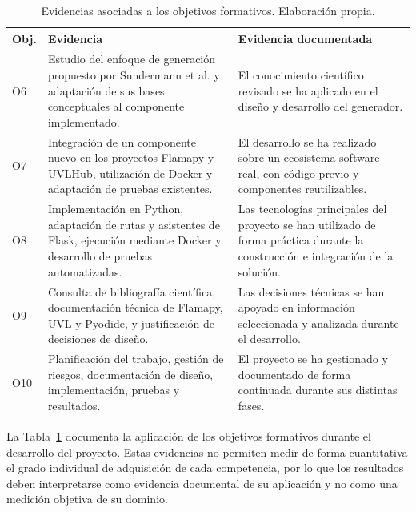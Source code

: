 \begin{table}[H]
\centering
\small
\setlength{\tabcolsep}{5pt}
\renewcommand{\arraystretch}{1.2}
\begin{tabularx}{\textwidth}{@{}
>{\centering\arraybackslash}p{0.9cm}
>{\raggedright\arraybackslash}p{3.8cm}
>{\raggedright\arraybackslash}X
@{}}
\toprule
\textbf{Obj.} & \textbf{Evidencia} & \textbf{Evidencia documentada} \\
\midrule
O6 & Estudio del enfoque de generación propuesto por Sundermann et al. y
adaptación de sus bases conceptuales al componente implementado. &
El conocimiento científico revisado se ha aplicado en el diseño y desarrollo
del generador. \\

O7 & Integración de un componente nuevo en los proyectos Flamapy y UVLHub,
utilización de Docker y adaptación de pruebas existentes. &
El desarrollo se ha realizado sobre un ecosistema software real, con código
previo y componentes reutilizables. \\

O8 & Implementación en Python, adaptación de rutas y asistentes de Flask,
ejecución mediante Docker y desarrollo de pruebas automatizadas. &
Las tecnologías principales del proyecto se han utilizado de forma práctica
durante la construcción e integración de la solución. \\

O9 & Consulta de bibliografía científica, documentación técnica de Flamapy,
UVL y Pyodide, y justificación de decisiones de diseño. &
Las decisiones técnicas se han apoyado en información seleccionada y analizada
durante el desarrollo. \\

O10 & Planificación del trabajo, gestión de riesgos, documentación de diseño,
implementación, pruebas y resultados. &
El proyecto se ha gestionado y documentado de forma continuada durante sus
distintas fases. \\
\bottomrule
\end{tabularx}
\caption{Evidencias asociadas a los objetivos formativos. Elaboración propia.}
\label{tab:evidencias-objetivos-formativos}
\end{table}

La Tabla~\ref{tab:evidencias-objetivos-formativos} documenta la aplicación de
los objetivos formativos durante el desarrollo del proyecto. Estas evidencias
no permiten medir de forma cuantitativa el grado individual de adquisición de
cada competencia, por lo que los resultados deben interpretarse como evidencia
documental de su aplicación y no como una medición objetiva de su dominio.

